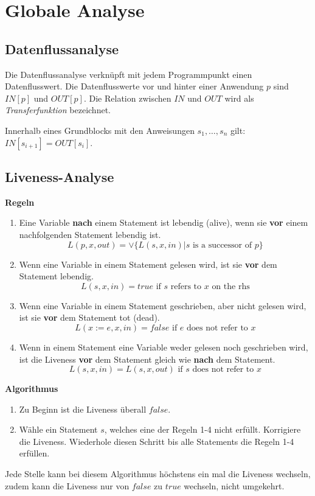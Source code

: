 \section{Globale Analyse}


\subsection{Datenflussanalyse}

Die Datenflussanalyse verknüpft mit jedem Programmpunkt einen Datenflusswert.
Die Datenflusswerte vor und hinter einer Anwendung $p$ sind $IN[p]$ und
$OUT[p]$. Die Relation zwischen $IN$ und $OUT$ wird als
\textit{Transferfunktion} bezeichnet.

Innerhalb eines Grundblocks mit den Anweisungen $s_1,\ldots,s_n$ gilt:
$IN[s_{i+1}] = OUT[s_i]$.


\subsection{Liveness-Analyse}

\textbf{Regeln}

\begin{enumerate}
	\item Eine Variable \textbf{nach} einem Statement ist lebendig (alive), wenn
		sie \textbf{vor} einem nachfolgenden Statement lebendig ist.\\
		\[ L(p, x, out) = \lor \{ L(s, x, in) | s \textrm{ is a successor of } p \} \]
	\item Wenn eine Variable in einem Statement gelesen wird, ist sie \textbf{vor}
		dem Statement lebendig.\\
		\[ L(s, x, in) = true \textrm{ if } s \textrm{ refers to } x \textrm{ on the rhs} \]
	\item Wenn eine Variable in einem Statement geschrieben, aber nicht gelesen
		wird, ist sie \textbf{vor} dem Statement tot (dead).\\
		\[ L(x := e, x, in) = false \textrm{ if } e \textrm{ does not refer to } x \]
	\item Wenn in einem Statement eine Variable weder gelesen noch geschrieben
		wird, ist die Liveness \textbf{vor} dem Statement gleich wie \textbf{nach}
		dem Statement.\\
		\[ L(s, x, in) = L(s, x, out) \textrm{ if } s \textrm{ does not refer to } x \]
\end{enumerate}

\textbf{Algorithmus}

\begin{enumerate}
	\item Zu Beginn ist die Liveness überall $false$.
	\item Wähle ein Statement $s$, welches eine der Regeln 1-4 nicht erfüllt.
		Korrigiere die Liveness. Wiederhole diesen Schritt bis alle Statements die
		Regeln 1-4 erfüllen.
\end{enumerate}

Jede Stelle kann bei diesem Algorithmus höchstens ein mal die Liveness wechseln,
zudem kann die Liveness nur von $false$ zu $true$ wechseln, nicht umgekehrt.
